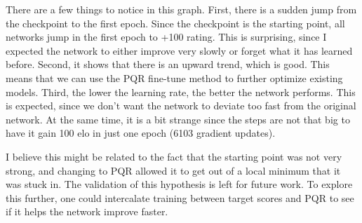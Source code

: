 There are a few things to notice in this graph. First, there is a sudden jump from the checkpoint to the first epoch. Since the checkpoint is the starting point, all networks jump in the first epoch to +100 rating. This is surprising, since I expected the network to either improve very slowly or forget what it has learned before.
Second, it shows that there is an upward trend, which is good. This means that we can use the PQR fine-tune method to further optimize existing models.
Third, the lower the learning rate, the better the network performs. This is expected, since we don't want the network to deviate too fast from the original network. At the same time, it is a bit strange since the steps are not that big to have it gain 100 elo in just one epoch (6103 gradient updates).

I believe this might be related to the fact that the starting point was not very strong, and changing to PQR allowed it to get out of a local minimum that it was stuck in. The validation of this hypothesis is left for future work. To explore this further, one could intercalate training between target scores and PQR to see if it helps the network improve faster.
